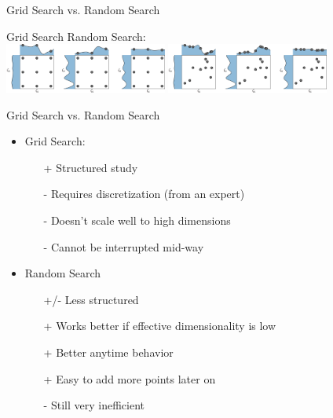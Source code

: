 \documentclass[aspectratio=169]{../latex_main/tntbeamer}  %
\begin{document}
\begin{frame}[c]{Grid Search vs. Random Search}
	
\centering
Grid Search \hspace{10em} Random Search:\\
\includegraphics[width=0.4\textwidth, trim=0 0 65em 0em, clip]{w10_autoRL/images/static_grid_new.png}
\includegraphics[width=0.4\textwidth, trim=0 0 65em 0em, clip]{w10_autoRL/images/static_random_new.png}

\end{frame}
\begin{frame}[c]{Grid Search vs. Random Search}
	
\begin{itemize}
    \item Grid Search:
    \begin{itemize}
        \item[+] Structured study
        \item[-] Requires discretization (from an expert)
        \item[-] Doesn't scale well to high dimensions
        \item[-] Cannot be interrupted mid-way
    \end{itemize}
    \item Random Search
    \begin{itemize}
        \item[+/-] Less structured
        \item[+] Works better if effective dimensionality is low 
        \item[+] Better anytime behavior
        \item[+] Easy to add more points later on
        \item[-] Still very inefficient
    \end{itemize}
\end{itemize}
\end{frame}
\end{document}
